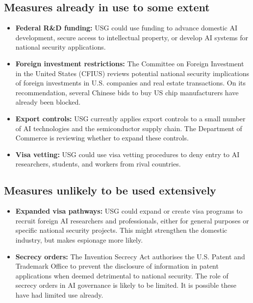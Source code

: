 \documentclass{article}
\begin{document}
\begin{multicols}{2}
\subsection{Measures already in use to some extent}
\begin{itemize}
\item \textbf{Federal R\&D funding:} USG could use funding to advance domestic AI development, secure access to intellectual property, or develop AI systems for national security applications.
\item \textbf{Foreign investment restrictions:} The Committee on Foreign Investment in the United States (CFIUS) reviews potential national security implications of foreign investments in U.S. companies and real estate transactions. On its recommendation, several Chinese bids to buy US chip manufacturers have already been blocked.
\item \textbf{Export controls:} USG currently applies export controls to a small number of AI technologies and the semiconductor supply chain. The Department of Commerce is reviewing whether to expand these controls.
\item \textbf{Visa vetting:} USG could use visa vetting procedures to deny entry to AI researchers, students, and workers from rival countries.
\end{itemize}
\subsection{Measures unlikely to be used extensively} 
\begin{itemize}
\item \textbf{Expanded visa pathways:} USG could expand or create visa programs to recruit foreign AI researchers and professionals, either for general purposes or specific national security projects. This might strengthen the domestic industry, but makes espionage more likely.
\item \textbf{Secrecy orders:} The Invention Secrecy Act authorises the U.S. Patent and Trademark Office to prevent the disclosure of information in patent applications when deemed detrimental to national security. The role of secrecy orders in AI governance is likely to be limited. It is possible these have had limited use already.
\end{itemize}

\end{multicols}
\end{document}
